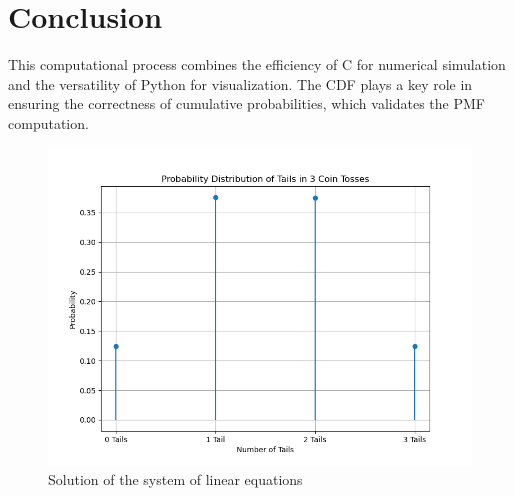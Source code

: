 \documentclass[journal]{IEEEtran}
\begin{document}
\section*{Conclusion}
This computational process combines the efficiency of C for numerical simulation and the versatility of Python for visualization. The CDF plays a key role in ensuring the correctness of cumulative probabilities, which validates the PMF computation.

	\begin{figure}[h!]
		\centering
		\includegraphics[width=\columnwidth]{figs/fig1.png}
		\caption{Solution of the system of linear equations}
		\label{stemplot}
	\end{figure}
	
\end{document}
